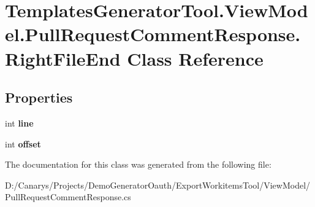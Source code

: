 \hypertarget{class_templates_generator_tool_1_1_view_model_1_1_pull_request_comment_response_1_1_right_file_end}{}\section{Templates\+Generator\+Tool.\+View\+Model.\+Pull\+Request\+Comment\+Response.\+Right\+File\+End Class Reference}
\label{class_templates_generator_tool_1_1_view_model_1_1_pull_request_comment_response_1_1_right_file_end}
\subsection*{Properties}
\begin{DoxyCompactItemize}
\item 
\mbox{\label{class_templates_generator_tool_1_1_view_model_1_1_pull_request_comment_response_1_1_right_file_end_ab4f4cfabba416767b4457e220f2f6bd3}} 
int {\bfseries line}
\item 
\mbox{\label{class_templates_generator_tool_1_1_view_model_1_1_pull_request_comment_response_1_1_right_file_end_af842467c236896d7a3d6113a7c66c202}} 
int {\bfseries offset}
\end{DoxyCompactItemize}


The documentation for this class was generated from the following file\+:\begin{DoxyCompactItemize}
\item 
D\+:/\+Canarys/\+Projects/\+Demo\+Generator\+Oauth/\+Export\+Workitems\+Tool/\+View\+Model/Pull\+Request\+Comment\+Response.\+cs\end{DoxyCompactItemize}
